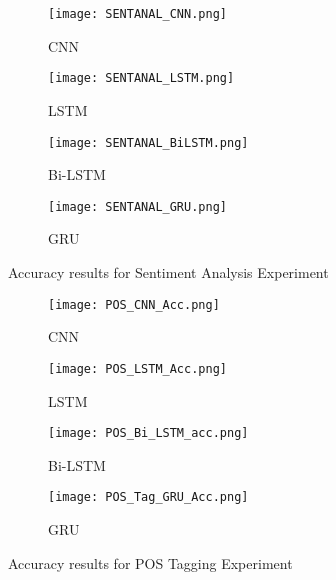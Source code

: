 \documentclass[twocolumn,12pt]{asme2ej}
\begin{document}
\newpage
\onecolumn

\begin{figure}[htb]
    \begin{subfigure}[b]{0.23\columnwidth}
        \texttt{[image: SENTANAL\_CNN.png]}
    \caption{CNN}
    \label{fig:bear}%
\end{subfigure}\hfill
\begin{subfigure}[b]{0.25\columnwidth}
        \texttt{[image: SENTANAL\_LSTM.png]}
    \caption{LSTM}
    \label{fig:lion}%
\end{subfigure}\hfill
\begin{subfigure}[b]{0.25\columnwidth}
        \texttt{[image: SENTANAL\_BiLSTM.png]}
    \caption{Bi-LSTM}
        \label{fig:tiger}
\end{subfigure}\hfill%
\begin{subfigure}[b]{0.25\columnwidth}
        \texttt{[image: SENTANAL\_GRU.png]}
    \caption{GRU}
        \label{fig:mouse}
\end{subfigure}
\caption{Accuracy results for Sentiment Analysis Experiment}
\label{figure_in_line}
    \end{figure}

\begin{figure}[htb]
    \begin{subfigure}[b]{0.25\columnwidth}
        \texttt{[image: POS\_CNN\_Acc.png]}
    \caption{CNN}
    \label{fig:bear}%
\end{subfigure}\hfill
\begin{subfigure}[b]{0.25\columnwidth}
        \texttt{[image: POS\_LSTM\_Acc.png]}
    \caption{LSTM}
    \label{fig:lion}%
\end{subfigure}\hfill
\begin{subfigure}[b]{0.25\columnwidth}
        \texttt{[image: POS\_Bi\_LSTM\_acc.png]}
    \caption{Bi-LSTM}
        \label{fig:tiger}
\end{subfigure}\hfill%
\begin{subfigure}[b]{0.25\columnwidth}
        \texttt{[image: POS\_Tag\_GRU\_Acc.png]}
    \caption{GRU}
        \label{fig:mouse}
\end{subfigure}
\caption{Accuracy results for POS Tagging Experiment}
\label{figure_in_line}
    \end{figure}
\end{document}
